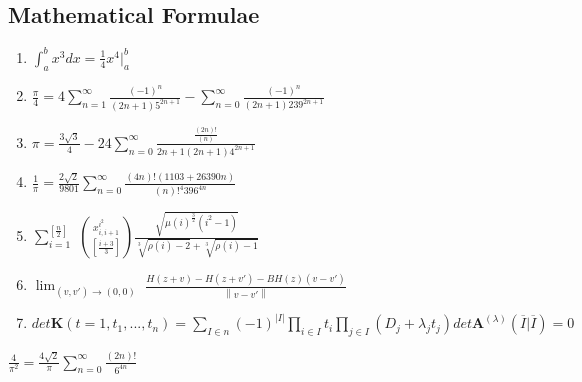 \documentclass[12pt,a4paper]{article}
\newcommand{\norm}[1]{\left\lVert#1\right\rVert}
\begin{document}
\subsection{Mathematical Formulae}
     \begin{enumerate}
     \item $\displaystyle\int_{a}^{b} x^3 dx = \frac{1}{4}x^4\bigg|_{a}^{b}$
     
     \item $\displaystyle\frac{\pi}{4} = 4 \sum_{n=1}^{\infty}\frac{(-1)^n}{(2n + 1)5^{2n+1}} - \sum_{n=0}^{\infty}\frac{(-1)^n}{(2n + 1)239^{2n+1}}$
     
     \item $\displaystyle\pi = \frac{3\sqrt{3}}{4} - 24 \sum_{n=0}^{\infty}\frac{\frac{(2n)!}{(n)}}{2n + 1(2n + 1)4^{2n+1}}$
     
    \newpage
     
     \item $\displaystyle \frac{1}{\pi} = \frac{2\sqrt{2}}{9801}\sum_{n=0}^{\infty}\frac{(4n)!(1103 + 26390n)}{(n)!^{4}396^{4n}}$
     
     \item $\sum_{i=1}^{[\frac{n}{2}]}$ $\displaystyle{{x_{i,i+1}^{i^2}}\choose [\frac{i+3}{3}]} \frac{\sqrt{\mu(i)^{\frac{3}{2}} (i^2 - 1)}}{\sqrt[3]{\rho(i)-2} + \sqrt[3]{\rho(i)-1}}$
     
     \item $\lim_{{(v,v')}\to{(0,0)}}$ $\displaystyle\frac{H(z+v) - H(z+v') - BH(z)(v-v')}{\norm{v-v'}}$

     \item $det \textbf{K}(t=1,t_1,...,t_n) = \sum_{I\in n}(-1)^{|I|}\prod_{i\in I}t_i\prod_{j\in I}(D_j+\lambda_j t_j) det\textbf{A}^{(\lambda)}(\overline{I}|\overline{I}) = 0$
     
     \end{enumerate}
     $\frac{4}{\pi^2}=\frac{4\sqrt{2}}{\pi}\sum\limits_{n=0}^{\infty} \frac{(2n)!}{6^{4n}}$
\end{document}
